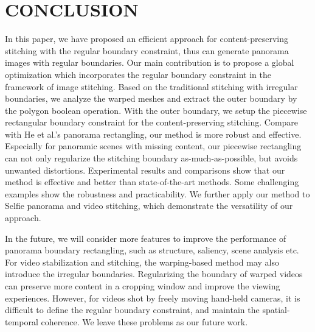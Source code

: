 \documentclass[10pt,journal,compsoc]{IEEEtran}
\begin{document}
 \section{CONCLUSION}
In this paper, we have proposed an efficient approach for content-preserving stitching with the regular boundary constraint, thus can generate panorama images with regular boundaries.
Our main contribution is to propose a global optimization which incorporates the regular boundary constraint in the framework of image stitching.
Based on the traditional stitching with irregular boundaries, we analyze the warped meshes and extract the outer boundary by the polygon boolean operation.
With the outer boundary, we setup the piecewise rectangular boundary constraint for the content-preserving stitching.
Compare with He et al.'s panorama rectangling, our method is more robust and effective.
Especially for panoramic scenes with missing content, our piecewise rectangling can not only regularize the stitching boundary as-much-as-possible, but avoids unwanted distortions.
Experimental results and comparisons show that our method is effective and better than state-of-the-art methods. Some challenging examples show the robustness and practicability.
We further apply our method to Selfie panorama and video stitching, which demonstrate the versatility of our approach.

In the future, we will consider more features to improve the performance of panorama boundary rectangling, such as structure, saliency, scene analysis etc.
For video stabilization and stitching, the warping-based method may also introduce the irregular boundaries.
Regularizing the boundary of warped videos can preserve more content in a cropping window and improve the viewing experiences.
However, for videos shot by freely moving hand-held cameras, it is difficult to define the regular boundary constraint, and maintain the spatial-temporal coherence.
We leave these problems as our future work.




\end{document}
